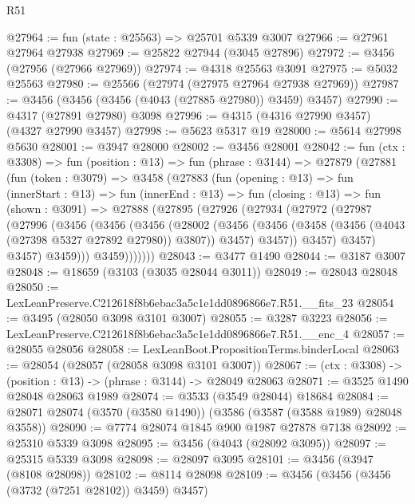 \begin{lexlean}{R51}
\begin{coremodule}
@27964 := fun (state : @25563) => @25701 @5339 @3007
@27966 := @27961 @27964 @27938
@27969 := @25822 @27944 (@3045 @27896)
@27972 := @3456 (@27956 (@27966 @27969))
@27974 := @4318 @25563 @3091
@27975 := @5032 @25563
@27980 := @25566 (@27974 (@27975 @27964 @27938 @27969))
@27987 := @3456 (@3456 (@3456 (@4043 (@27885 @27980)) @3459) @3457)
@27990 := @4317 (@27891 @27980) @3098
@27996 := @4315 (@4316 @27990 @3457) (@4327 @27990 @3457)
@27998 := @5623 @5317 @19
@28000 := @5614 @27998 @5630
@28001 := @3947 @28000
@28002 := @3456 @28001
@28042 := fun (ctx : @3308) =>
  fun (position : @13) =>
  fun (phrase : @3144) =>
  @27879
    (@27881
      (fun (token : @3079) =>
      @3458
        (@27883
          (fun (opening : @13) =>
          fun (innerStart : @13) =>
          fun (innerEnd : @13) =>
          fun (closing : @13) =>
          fun (shown : @3091) =>
          @27888
            (@27895
              (@27926
                (@27934
                  (@27972
                    (@27987
                      (@27996
                        (@3456
                          (@3456
                            (@3456
                              (@28002
                                (@3456
                                  (@3456
                                    (@3458 (@3456 (@4043 (@27398 @5327 @27892 @27980)) @3807))
                                    @3457)
                                  @3457))
                              @3457)
                            @3457)
                          @3457)
                        @3459)))
                  @3459)))))))
@28043 := @3477 @1490
@28044 := @3187 @3007
@28048 := @18659 (@3103 (@3035 @28044 @3011))
@28049 := @28043 @28048
@28050 := LexLeanPreserve.C212618f8b6ebac3a5c1e1dd0896866e7.R51.__fits_23
@28054 := @3495 (@28050 @3098 @3101 @3007)
@28055 := @3287 @3223
@28056 := LexLeanPreserve.C212618f8b6ebac3a5c1e1dd0896866e7.R51.__enc_4
@28057 := @28055 @28056
@28058 := LexLeanBoot.PropositionTerms.binderLocal
@28063 := @28054 (@28057 (@28058 @3098 @3101 @3007))
@28067 := (ctx : @3308) -> (position : @13) -> (phrase : @3144) -> @28049 @28063
@28071 := @3525 @1490 @28048 @28063 @1989
@28074 := @3533 (@3549 @28044) @18684
@28084 := @28071 @28074 (@3570 (@3580 @1490)) (@3586 (@3587 (@3588 @1989) @28048 @3558))
@28090 := @7774 @28074 @1845 @900 @1987 @27878 @7138
@28092 := @25310 @5339 @3098
@28095 := @3456 (@4043 (@28092 @3095))
@28097 := @25315 @5339 @3098
@28098 := @28097 @3095
@28101 := @3456 (@3947 (@8108 @28098))
@28102 := @8114 @28098
@28109 := @3456 (@3456 (@3456 (@3732 (@7251 @28102)) @3459) @3457)

\end{coremodule}
\end{lexlean}
